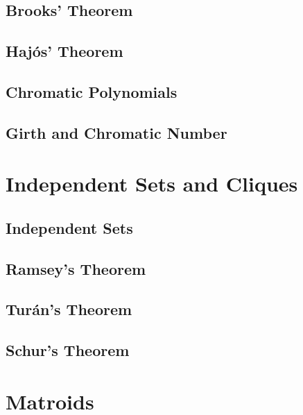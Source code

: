 		\section{Brooks' Theorem}

		\section{Haj\'{o}s' Theorem}

		\section{Chromatic Polynomials}

		\section{Girth and Chromatic Number}

	\chapter{Independent Sets and Cliques}
		\section{Independent Sets}

		\section{Ramsey's Theorem}

		\section{Tur\'{a}n's Theorem}

		\section{Schur's Theorem}

	\chapter{Matroids}
